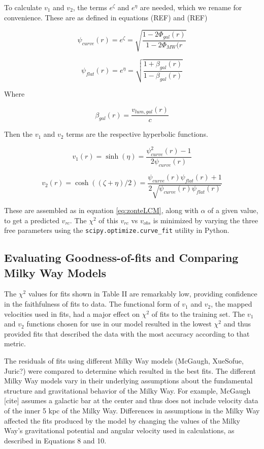 \documentclass[reprint,%
 amsmath,amssymb,
 aps,
]{revtex4-1}
\begin{document}
To calculate $v_1$ and $v_2$,   the terms $e^\zeta$ and $e^\eta$ are needed, which we rename for convenience. These are as defined in equations (REF) and (REF)

\begin{equation}
    \psi_{curve}(r) = e^\zeta = \sqrt{\frac{1 - 2\Phi_{gal}(r)}{1 - 2\Phi_{MW}(r}}
\end{equation}

\begin{equation}
    \psi_{flat}(r) = e^\eta = \sqrt{\frac{1 + \beta_{gal}(r)}{1 - \beta_{gal}(r)}}
\end{equation}

Where

\begin{equation}
    \beta_{gal}(r) = \frac{v_{lum,gal}(r)}{c}
\end{equation}

Then the $v_1$ and $v_2$ terms are the respective hyperbolic functions.

\begin{equation}
    v_1(r) = \sinh(\eta) = \frac{\psi_{curve}^2(r) - 1}{2 \psi_{curve}(r)}
\end{equation}

\begin{equation}
    v_2(r) = \cosh((\zeta + \eta)/2) = \frac{\psi_{curve}(r) \psi_{flat}(r) + 1}{
    2\sqrt{\psi_{curve}(r) \psi_{flat}(r)}}
\end{equation}

These are assembled as in equation \ref{eq:zonteLCM}, along with $\alpha$ of a given value, to get a predicted $v_{rc}$. The $\chi^2$ of this $v_{rc}$ vs $v_{obs}$ is minimized by varying the three free parameters using the {\tt scipy.optimize.curve\_fit} utility in Python.

\subsection{Evaluating Goodness-of-fits and Comparing Milky Way Models}
The $\chi^{2}$ values for fits shown in Table II are remarkably low, providing confidence in the faithfulness of fits to data. The functional form of ${v_1}$ and ${v_2}$, the mapped velocities used in fits, had a major effect on $\chi^{2}$ of fits to the training set. The ${v_1}$ and ${v_2}$ functions chosen for use in our model resulted in the lowest $\chi^{2}$ and thus provided fits that described the data with the most accuracy according to that metric.

The residuals of fits using different Milky Way models (McGaugh, XueSofue, Juric?) were compared to determine which resulted in the best fits. The different Milky Way models vary in their underlying assumptions about the fundamental structure and gravitational behavior of the Milky Way. For example, McGaugh [cite] assumes a galactic bar at the center and thus does not include velocity data of the inner 5 kpc of the Milky Way. Differences in assumptions in the Milky Way affected the fits produced by the model by changing the values of the Milky Way's gravitational potential and angular velocity used in calculations, as described in Equations 8 and 10. 
\end{document}
